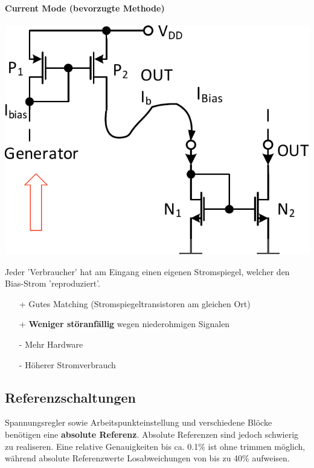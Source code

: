 \paragraph{Current Mode (bevorzugte Methode)}

\begin{minipage}[t]{0.45\columnwidth}
    \includegraphics[width=\columnwidth, align=t]{images/13_current_mode.pdf}
\end{minipage}
\hfill
\begin{minipage}[t]{0.53\columnwidth}
    Jeder 'Verbraucher' hat am Eingang einen eigenen Stromspiegel, welcher den Bias-Strom 'reproduziert'.

    \smallskip

    \begin{itemize}
        \item[+] Gutes Matching (Stromspiegeltransistoren am gleichen Ort)
        \item[+] \textbf{Weniger störanfällig} wegen niederohmigen Signalen
        \item[-] Mehr Hardware
        \item[-] Höherer Stromverbrauch
    \end{itemize}
\end{minipage}



\subsection{Referenzschaltungen}
Spannungsregler sowie Arbeitspunkteinstellung und verschiedene Blöcke benötigen eine \textbf{absolute Referenz}.
Absolute Referenzen sind jedoch schwierig zu realiseren.
Eine relative Genauigkeiten bis ca. 0.1\% ist ohne trimmen möglich, während absolute Referenzwerte Losabweichungen von bis zu 40\% aufweisen.

